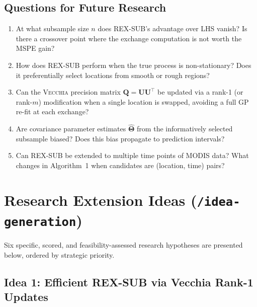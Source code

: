 \documentclass[12pt, a4paper]{article}
\newcommand{\Vecchia}{\textsc{Vecchia}}
\begin{document}
\subsection{Questions for Future Research}

\begin{enumerate}[label=\textbf{Q\arabic*.}, leftmargin=2.5em]
  \item At what subsample size $n$ does REX-SUB's advantage over LHS vanish?  Is
    there a crossover point where the exchange computation is not worth the MSPE
    gain?

  \item How does REX-SUB perform when the true process is non-stationary?  Does it
    preferentially select locations from smooth or rough regions?

  \item Can the \Vecchia{} precision matrix $\mathbf{Q} = \mathbf{U}\mathbf{U}^\top$
    be updated via a rank-1 (or rank-$m$) modification when a single location is
    swapped, avoiding a full GP re-fit at each exchange?

  \item Are covariance parameter estimates $\hat{\boldsymbol{\Theta}}$ from the
    informatively selected subsample biased?  Does this bias propagate to prediction
    intervals?

  \item Can REX-SUB be extended to multiple time points of MODIS data?  What
    changes in Algorithm~1 when candidates are (location, time) pairs?
\end{enumerate}

\section{Research Extension Ideas (\texttt{/idea-generation})}

Six specific, scored, and feasibility-assessed research hypotheses are presented
below, ordered by strategic priority.

\subsection{Idea 1: Efficient REX-SUB via Vecchia Rank-1 Updates}
\end{document}
